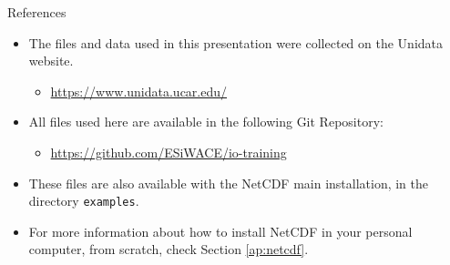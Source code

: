 \documentclass[compress,11pt,xcolor=svgnames,aspectratio=169]{beamer}
\begin{document}
\begin{frame}[fragile]{References}

\begin{itemize}
\setlength\itemsep{0.6cm}

  \item The files and data used in this presentation were collected on the Unidata website.

    \begin{itemize}
    \item \url{https://www.unidata.ucar.edu/}
    \end{itemize}

  \item All files used here are available in the following Git Repository:

    \begin{itemize}
    \item \url{https://github.com/ESiWACE/io-training}
    \end{itemize}

  \item These files are also available with the NetCDF main installation, in the directory \texttt{examples}.

  \item For more information about how to install NetCDF in your personal computer, from scratch, check Section \ref{ap:netcdf}.

\end{itemize}

\end{frame}
\end{document}
